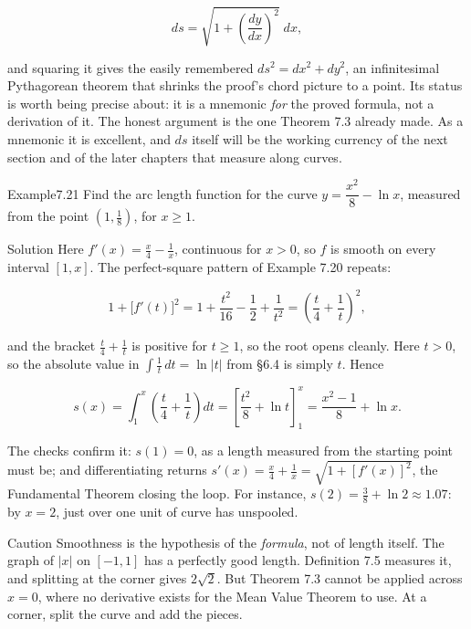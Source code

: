 \documentclass[a4paper,12pt,oneside]{memoir}
\begin{document}
\[ ds = \sqrt{1 + \left(\frac{dy}{dx}\right)^{2}}\;dx, \]

and squaring it gives the easily remembered \emph{\(ds^{2} = dx^{2} + dy^{2}\)}, an infinitesimal Pythagorean theorem that shrinks the proof’s chord picture to a point. Its status is worth being precise about: it is a mnemonic \emph{for} the proved formula, not a derivation of it. The honest argument is the one Theorem 7.3 already made. As a mnemonic it is excellent, and \(ds\) itself will be the working currency of the next section and of the later chapters that measure along curves.

\begin{workedexample}
\begin{envexample}{Example}{7.21}{}
Find the arc length function for the curve \(y = \dfrac{x^{2}}{8} - \ln x\), measured from the point \((1, \tfrac{1}{8})\), for \(x \ge 1\).
\end{envexample}
\begin{envsolution}{Solution}{}{}
Here \(f'(x) = \tfrac{x}{4} - \tfrac{1}{x}\), continuous for \(x > 0\), so \(f\) is smooth on every interval \([1, x]\). The perfect-square pattern of Example 7.20 repeats:

\[ 1 + \bigl[f'(t)\bigr]^{2} = 1 + \frac{t^{2}}{16} - \frac{1}{2} + \frac{1}{t^{2}} = \left(\frac{t}{4} + \frac{1}{t}\right)^{2}, \]

and the bracket \(\tfrac{t}{4} + \tfrac{1}{t}\) is positive for \(t \ge 1\), so the root opens cleanly. Here \(t > 0\), so the absolute value in \(\int \tfrac{1}{t}\,dt = \ln\lvert t\rvert\) from §6.4 is simply \(t\). Hence

\[ s(x) = \int_{1}^{x} \left(\frac{t}{4} + \frac{1}{t}\right) dt = \left[\frac{t^{2}}{8} + \ln t\right]_{1}^{x} = \frac{x^{2} - 1}{8} + \ln x. \]

The checks confirm it: \(s(1) = 0\), as a length measured from the starting point must be; and differentiating returns \(s'(x) = \tfrac{x}{4} + \tfrac{1}{x} = \sqrt{1 + [f'(x)]^{2}}\), the Fundamental Theorem closing the loop. For instance, \(s(2) = \tfrac{3}{8} + \ln 2 \approx 1.07\): by \(x = 2\), just over one unit of curve has unspooled. \qedmark
\end{envsolution}
\end{workedexample}
\begin{envcaution}{Caution}{}{}
Smoothness is the hypothesis of the \emph{formula}, not of length itself. The graph of \(\lvert x\rvert\) on \([-1, 1]\) has a perfectly good length. Definition 7.5 measures it, and splitting at the corner gives \(2\sqrt{2}\). But Theorem 7.3 cannot be applied across \(x = 0\), where no derivative exists for the Mean Value Theorem to use. At a corner, split the curve and add the pieces.
\end{envcaution}
\end{document}
